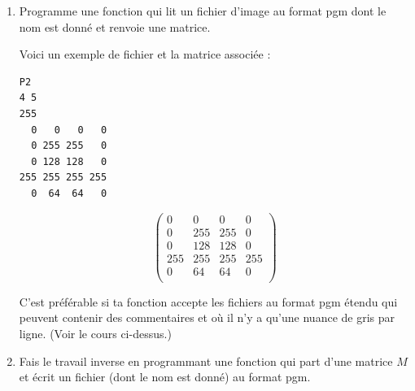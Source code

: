 \documentclass[11pt,class=report,crop=false]{standalone}
\begin{document}
\begin{activite}
	
	
	
\begin{enumerate}
	\item Programme une fonction 
	qui lit un fichier d'image au format \og{}pgm\fg{} dont le nom est donné et renvoie une matrice. 
	
	Voici un exemple de fichier et la matrice associée :
\begin{center}
\begin{minipage}{0.4\textwidth}
\begin{lstlisting}
P2
4 5
255
  0   0   0   0
  0 255 255   0
  0 128 128   0
255 255 255 255
  0  64  64   0
\end{lstlisting}
\end{minipage}
\begin{minipage}{0.4\textwidth}
$$\begin{pmatrix}
   0 &   0 &   0 &   0 \\
0 & 255 & 255 &   0 \\
0 & 128 & 128 &   0 \\
255 & 255 & 255 & 255 \\
0 &  64 &  64 &   0 \\
\end{pmatrix}$$
\end{minipage}	
\end{center}

	C'est préférable si ta fonction accepte les fichiers au format \og{}pgm\fg{} étendu qui peuvent contenir des commentaires et où il n'y a qu'une nuance de gris par ligne. (Voir le cours ci-dessus.)
		
	\item Fais le travail inverse en programmant une fonction  qui part d'une matrice $M$ et écrit un fichier (dont le nom est donné) au format \og{}pgm\fg{}.
		
\end{enumerate}

\end{activite}



\end{document}
